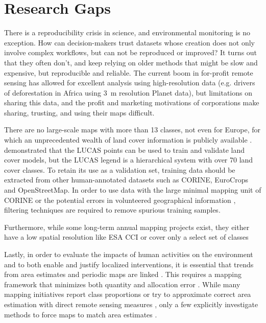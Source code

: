 \section{Research Gaps}

    There is a reproducibility crisis in science, and environmental monitoring is no exception. How can decision-makers trust datasets whose creation does not only involve complex workflows, but can not be reproduced or improved? It turns out that they often don't, and keep relying on older methods that might be slow and expensive, but reproducible and reliable. The current boom in for-profit remote sensing has allowed for excellent analysis using high-resolution data (e.g. drivers of deforestation in Africa \citep{masolele2024mapping} using 3~m resolution Planet data), but limitations on sharing this data, and the profit and marketing motivations of corporations make sharing, trusting, and using their maps difficult.

    There are no large-scale maps with more than 13 classes, not even for Europe, for which an unprecedented wealth of land cover information is publicly available \citep{dandrimont2020harmonised}. \citet{pflugmacher2019mapping} demonstrated that the LUCAS points can be used to train and validate land cover models, but the LUCAS legend is a hierarchical system with over 70 land cover classes. To retain its use as a validation set, training data should be extracted from other human-annotated datasets such as CORINE, EuroCrops \citep{schneider2023eurocrops} and OpenStreetMap. In order to use data with the large minimal mapping unit of CORINE or the potential errors in volunteered geographical information \citep{neis2014recent}, filtering techniques are required to remove spurious training samples.

    Furthermore, while some long-term annual mapping projects exist, they either have a low spatial resolution like ESA CCI \citep{harper202229} or cover only a select set of classes \citep{hansen2022global}

    Lastly, in order to evaluate the impacts of human activities on the environment and to both enable and justify localized interventions, it is essential that trends from area estimates and periodic maps are linked \citep{olofsson2014good,szantoi2020addressing,winkler2021global}. This requires a mapping framework that minimizes both quantity and allocation error \citep{pontius2011death}. While many mapping initiatives report class proportions \citep{pflugmacher2019mapping} or try to approximate correct area estimation with direct remote sensing measures \citep{kleinewillinghofer2022unbiased}, only a few explicitly investigate methods to force maps to match area estimates \citep{strahler1980use,horvath2021comparison}.
    


